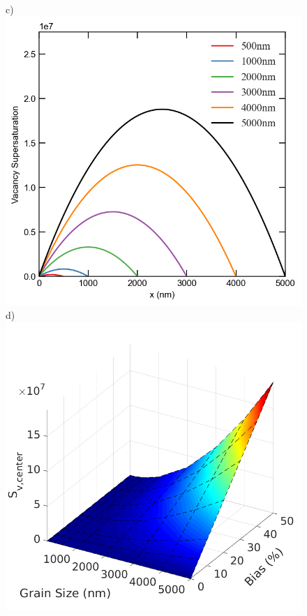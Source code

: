 \documentclass[utf8]{frontiersSCNS} %
\begin{document}
\begin{figure}[h!]
        c)\includegraphics[scale=0.55]{super_saturation_500-5000nm-high_neutron-5}
        d)\includegraphics[scale=0.38]{data_high_neutron_Sv_center}

\end{figure}
\end{document}
